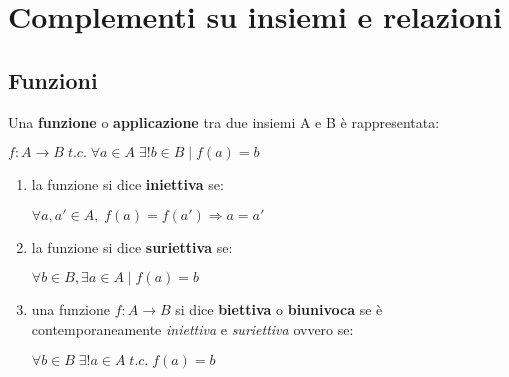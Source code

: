 \chapter{Complementi su insiemi e relazioni}

\section{Funzioni}
Una \textbf{funzione} o \textbf{applicazione} tra due insiemi A e B è rappresentata:
\begin{center}
    $f : A \rightarrow B \; t.c. \; \forall a \in A \; \exists ! b \in B \; | \; f(a) = b$
\end{center}
\begin{enumerate}
    \item la funzione si dice \textbf{iniettiva} se:
        \begin{center}
            $\forall a, a' \in A, \; f(a) = f(a') \Rightarrow a = a'$
        \end{center}
    \item la funzione si dice \textbf{suriettiva} se:
        \begin{center}
            $\forall b \in B, \exists a \in A \; | \; f(a) = b$    
        \end{center}
    \item una funzione $f : A \rightarrow B$ si dice \textbf{biettiva} o \textbf{biunivoca} se è contemporaneamente \textit{iniettiva} e \textit{suriettiva} ovvero se:
        \begin{center}
            $\forall b \in B \; \exists ! a \in A \; t.c. \; f(a) = b $
        \end{center}
\end{enumerate}

\newpage
